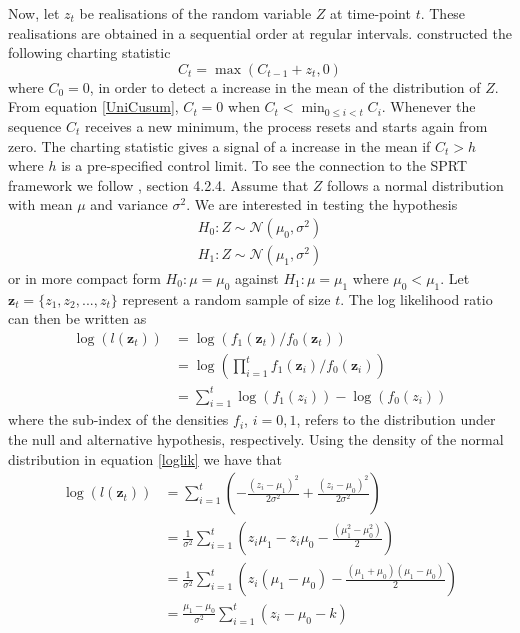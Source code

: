 Now, let $z_t$ be realisations of the random variable $Z$ at time-point $t$. These realisations are obtained in a sequential order at regular intervals. \citet{ESPAGE} constructed the following charting statistic
\begin{equation}\label{UniCusum}
C_{t}=\max(C_{t-1}+z_t,0)
\end{equation}
where $C_{0}=0$, in order to detect a increase in the mean of the distribution of $Z$. From equation \eqref{UniCusum}, $C_t=0$ when $C_t<\min_{0 \leq i < t} C_i$. Whenever the sequence $C_t$ receives a new minimum, the process resets and starts again from zero. The charting statistic gives a signal of a increase in the mean if $C_{t}>h$ where $h$ is a pre-specified control limit. To see the connection to the SPRT framework we follow \citet{SPCIntro}, section 4.2.4. Assume that $Z$ follows a normal distribution with mean $\mu$ and variance $\sigma^2$. We are interested in testing the hypothesis 
\begin{align*}
&H_0: Z \sim \mathcal{N}(\mu_0,\sigma^2)& \\
&H_1: Z \sim \mathcal{N}(\mu_1,\sigma^2)& 
\end{align*}
or in more compact form $H_0:\mu=\mu_0$ against $H_1: \mu=\mu_1$ where $\mu_0<\mu_1$. Let $\mathbf{z}_t=\{z_1,z_2,...,z_t\}$ represent a random sample of size $t$. The log likelihood ratio can then be written as 
\begin{align}
\log(l(\mathbf{z}_t)) & =  \log(f_{1}(\mathbf{z}_t)/f_{0}(\mathbf{z}_t))  \nonumber \\
					 & = \log\left(\prod_{i=1}^t f_{1}(\mathbf{z}_i)/f_{0}(\mathbf{z}_i) \right) \nonumber \\ 
				     & = \sum_{i=1}^t \log(f_{1}(z_i))-\log(f_{0}(z_i)) \label{loglik}
\end{align}
where the sub-index of the densities $f_i$, $i=0,1$, refers to the distribution under the null and alternative hypothesis, respectively. Using the density of the normal distribution in equation \eqref{loglik} we have that 
\begin{align}
\log(l(\mathbf{z}_t)) &= \sum_{i=1}^t \left( -\frac{(z_i-\mu_1)^2}{2\sigma^2} + \frac{(z_i-\mu_0)^2}{2\sigma^2} \right) \nonumber \\ 
& = \frac{1}{\sigma^2}\sum_{i=1}^t \left(z_i \mu_1-z_i\mu_0-\frac{(\mu_1^2-\mu_0^2)}{2} \right) \nonumber \\
& = \frac{1}{\sigma^2}\sum_{i=1}^t \left(z_i (\mu_1-\mu_0)-\frac{(\mu_1+\mu_0)(\mu_1-\mu_0)}{2} \right)  \nonumber \\
 &= \frac{\mu_1-\mu_0}{\sigma^2}\sum_{i=1}^t \left(z_i-\mu_0 -k\right)
\end{align}
